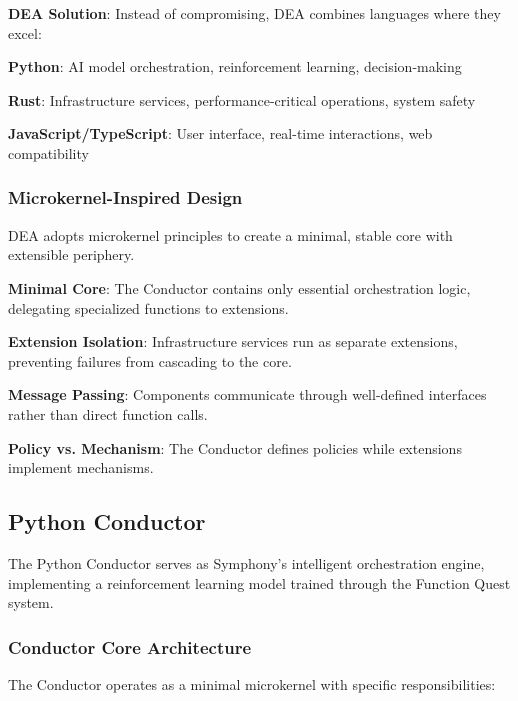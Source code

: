 \textbf{DEA Solution}: Instead of compromising, DEA combines languages where they excel:
\begin{compactlist}
    \item \textbf{Python}: AI model orchestration, reinforcement learning, decision-making
    \item \textbf{Rust}: Infrastructure services, performance-critical operations, system safety
    \item \textbf{JavaScript/TypeScript}: User interface, real-time interactions, web compatibility
\end{compactlist}

\subsubsection*{Microkernel-Inspired Design}

DEA adopts microkernel principles to create a minimal, stable core with extensible periphery.

\begin{infobox}[title=Microkernel Principles in DEA]
\textbf{Minimal Core}: The Conductor contains only essential orchestration logic, delegating specialized functions to extensions.

\textbf{Extension Isolation}: Infrastructure services run as separate extensions, preventing failures from cascading to the core.

\textbf{Message Passing}: Components communicate through well-defined interfaces rather than direct function calls.

\textbf{Policy vs. Mechanism}: The Conductor defines policies while extensions implement mechanisms.
\end{infobox}

\subsection*{Python Conductor}

The Python Conductor serves as Symphony's intelligent orchestration engine, implementing a reinforcement learning model trained through the Function Quest system.

\subsubsection*{Conductor Core Architecture}

The Conductor operates as a minimal microkernel with specific responsibilities:

